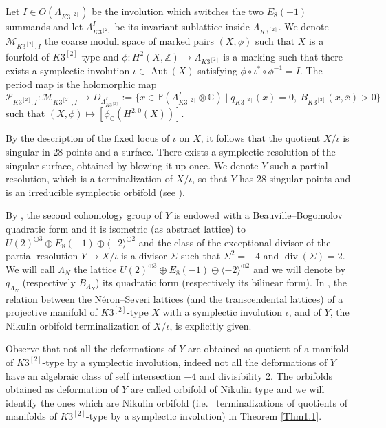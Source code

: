 \documentclass{amsart}
\theoremstyle{definition}
\numberwithin{equation}{section}
\numberwithin{equation}{section} \theoremstyle{definition}
\DeclareMathOperator{\Aut}{Aut}
\DeclareMathOperator{\divi}{div}
\newcommand{\ra}{\rightarrow}
\newcommand\Z{\mathbb{Z}}
\begin{document}
Let $I\in O(\Lambda_{K3^{[2]}})$ be the involution which switches the two $E_8(-1)$ summands and let $\Lambda_{K3^{[2]}}^I$ be its invariant sublattice inside $\Lambda_{K3^{[2]}}$.
We denote  $\mathcal{M}_{K3^{[2]},I}$ the coarse moduli space of  marked pairs $(X,\phi)$ such that $X$ is a fourfold of $K3^{[2]}$-type and $\phi:H^2(X,\Z)\rightarrow \Lambda_{K3^{[2]}}$ is a marking such that there exists a symplectic involution $\iota\in\Aut(X)$ satisfying $\phi\circ\iota^*\circ\phi ^{-1}=I$. The period map is the holomorphic map \[\mathcal{P}_{K3^{[2]},I}:\mathcal{M}_{K3^{[2]},I}\rightarrow D_{\Lambda_{K3^{[2]}}^I}:=\{x\in\mathbb{P}(\Lambda_{K3^{[2]}}^I\otimes \mathbb{C})\mid q_{K3^{[2]}}(x)=0,\ B_{K3^{[2]}}(x,\overline{x})>0\}
\]
such that $(X,\phi)\mapsto [\phi_{\mathbb{C}}(H^{2,0}(X))].$

By the description of the fixed locus of $\iota$ on $X$, it follows that the quotient $X/\iota$ is singular in 28 points and a surface. There exists a symplectic resolution of the singular surface, obtained by blowing it up once. We denote $Y$ such a partial resolution, which is a terminalization of $X/\iota$, so that $Y$ has 28 singular points and is an irreducible symplectic orbifold (see \cite{Fuj}). 

By \cite{Menet}, the second cohomology group of $Y$ is endowed with a Beauville--Bogomolov quadratic form  and it is isometric (as abstract lattice) to  $U(2)^{\oplus 3}\oplus E_8(-1)\oplus \langle -2\rangle^{\oplus 2}$ and the class of the exceptional divisor of the partial resolution $Y\ra X/\iota$ is a divisor $\Sigma$ such that $\Sigma^2=-4$ and $\divi(\Sigma)=2$. We will call $\Lambda_N$ the lattice $U(2)^{\oplus 3}\oplus E_8(-1)\oplus \langle -2\rangle^{\oplus 2}$ and we will denote by $q_{\Lambda_N}$ (respectively $B_{\Lambda_N}$) its quadratic form (respectively its bilinear form).
In \cite[Table 3]{CGKK}, the relation between the N\'eron--Severi lattices (and the transcendental lattices) of a projective  manifold of $K3^{[2]}$-type $X$ with a symplectic involution $\iota$, and of $Y$, the Nikulin orbifold terminalization of $X/\iota$, is explicitly given.


Observe that not all the deformations of $Y$ are obtained as quotient of a  manifold of $K3^{[2]}$-type by a symplectic involution,  indeed not all the deformations of $Y$ have an algebraic class of self intersection $-4$ and divisibility 2. The orbifolds obtained as deformation of $Y$ are called orbifold of Nikulin type and we will identify the ones which are Nikulin orbifold (i.e.~ terminalizations of quotients of manifolds of $K3^{[2]}$-type by a symplectic involution) in Theorem \ref{Thm1.1}.
\end{document}
